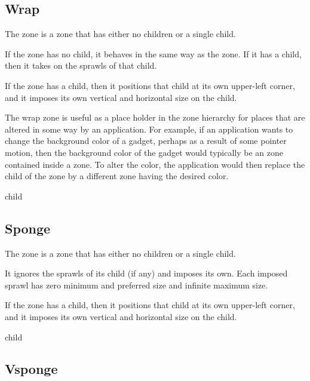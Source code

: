 \subsection{Wrap}
\label{sec-zones-layout-wrap}

The  zone is a zone that has either no children or a single
child.  

If the  zone has no child, it behaves in the same way as
the  zone.  If it has a
child, then it takes on the sprawls of that child.

If the  zone has a child, then it positions that child at
its own upper-left corner, and it imposes its own vertical and
horizontal size on the child.

The wrap zone is useful as a place holder in the zone hierarchy for
places that are altered in some way by an application.  For example,
if an application wants to change the background color of a gadget,
perhaps as a result of some pointer motion, then the background color
of the gadget would typically be an  zone
 contained inside a 
zone.  To alter the color, the application would then replace the
child of the  zone by a different  zone having
the desired color.


 {\optional child}

\subsection{Sponge}
\label{sec-zones-layout-sponge}

The  zone is a zone that has either no children or a
single child.  

It ignores the sprawls of its child (if any) and imposes its own.
Each imposed sprawl has zero minimum and preferred size and infinite
maximum size.

If the  zone has a child, then it positions that child at
its own upper-left corner, and it imposes its own vertical and
horizontal size on the child.


 {\optional child}

\subsection{Vsponge}
\label{sec-zones-layout-vsponge}

